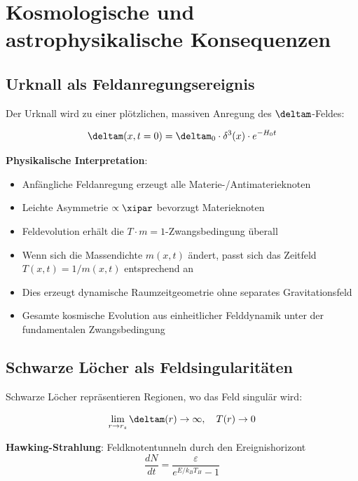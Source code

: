 	\section{Kosmologische und astrophysikalische Konsequenzen}
	
	\subsection{Urknall als Feldanregungsereignis}
	
	Der Urknall wird zu einer plötzlichen, massiven Anregung des $\deltam$-Feldes:
	
	\begin{equation}
		\deltam(x,t=0) = \deltam_0 \cdot \delta^3(x) \cdot e^{-H_0 t}
	\end{equation}
	
	\textbf{Physikalische Interpretation}:
	\begin{itemize}
		\item Anfängliche Feldanregung erzeugt alle Materie-/Antimaterieknoten
		\item Leichte Asymmetrie $\propto \xipar$ bevorzugt Materieknoten
		\item Feldevolution erhält die $T \cdot m = 1$-Zwangsbedingung überall
		\item Wenn sich die Massendichte $m(x,t)$ ändert, passt sich das Zeitfeld $T(x,t) = 1/m(x,t)$ entsprechend an
		\item Dies erzeugt dynamische Raumzeitgeometrie ohne separates Gravitationsfeld
		\item Gesamte kosmische Evolution aus einheitlicher Felddynamik unter der fundamentalen Zwangsbedingung
	\end{itemize}
	
	\subsection{Schwarze Löcher als Feldsingularitäten}
	
	Schwarze Löcher repräsentieren Regionen, wo das Feld singulär wird:
	
	\begin{equation}
		\lim_{r \to r_s} \deltam(r) \to \infty, \quad T(r) \to 0
	\end{equation}
	
	\textbf{Hawking-Strahlung}: Feldknotentunneln durch den Ereignishorizont
	\begin{equation}
		\frac{dN}{dt} = \frac{\varepsilon}{e^{E/k_B T_H} - 1}
	\end{equation}
	
